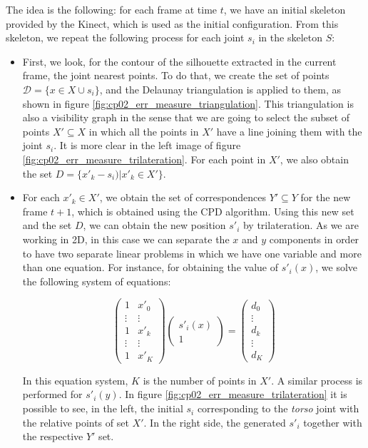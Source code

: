 The idea is the following: for each frame at time $t$, we have an initial skeleton provided by the Kinect, which is used as the initial configuration. From this skeleton, we repeat the following process for each joint $s_i$ in the skeleton $S$:
\begin{itemize}
 \item First, we look, for the contour of the silhouette extracted in the current frame, the joint nearest points. To do that, we create the set of points $\mathcal{D} = \{ x \in X \cup s_i \}$, and the Delaunay triangulation \cite{lingas1994linear} is applied to them, as shown in figure \ref{fig:cp02_err_measure_triangulation}. This triangulation is also a visibility graph in the sense that we are going to select the subset of points $X' \subseteq X$ in which all the points in $X'$ have a line joining them with the joint $s_i$. It is more clear in the left image of figure \ref{fig:cp02_err_measure_trilateration}. For each point in $X'$, we also obtain the set $D = \{ x'_k - s_i) | x'_k \in X' \} $.
 \item For each $x'_k \in X'$, we obtain the set of correspondences $Y' \subseteq Y$ for the new frame $t + 1$, which is 
obtained using the CPD algorithm. Using this new set and the set $D$, we can obtain the new position $s'_i$ by 
trilateration. As we are working in 2D, in this case we can separate the $x$ and $y$ components in order to have two 
separate linear problems in which we have one variable and more than one equation. For instance, for obtaining the 
value of $s'_i(x)$, we solve the following system of equations:
 
 \begin{equation}
  \left( \begin{array}{cc}
1 & x'_0 \\
\vdots & \vdots \\
1 & x'_k \\
\vdots & \vdots \\
1 & x'_K \end{array} \right)
  \left( \begin{array}{c}
s'_i(x) \\
1 \end{array} \right) = 
  \left( \begin{array}{cc}
d_0 \\
\vdots \\
d_k \\
\vdots \\
d_K \end{array} \right)
 \end{equation}
 
In this equation system, $K$ is the number of points in $X'$. A similar process is performed for $s'_i(y)$. In 
figure \ref{fig:cp02_err_measure_trilateration} it is possible to see, in the left, the initial $s_i$ corresponding to the 
\textit{torso} joint with the relative points of set $X'$. In the right side, the generated $s'_i$ together with the 
respective $Y'$ set.
\end{itemize}

